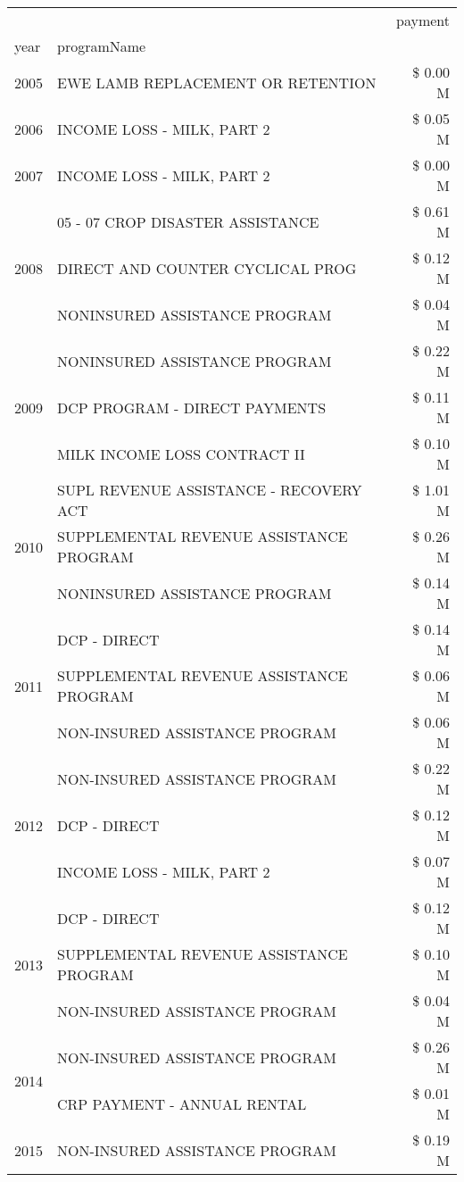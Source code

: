 \begin{tabular}{llr}
\toprule
 &  & payment \\
year & programName &  \\
\midrule
2005 & EWE LAMB REPLACEMENT OR RETENTION & \$ 0.00 M \\
\cline{1-3}
2006 & INCOME LOSS - MILK, PART 2 & \$ 0.05 M \\
\cline{1-3}
2007 & INCOME LOSS - MILK, PART 2 & \$ 0.00 M \\
\cline{1-3}
\multirow[t]{3}{*}{2008} & 05 - 07 CROP DISASTER ASSISTANCE & \$ 0.61 M \\
 & DIRECT AND COUNTER CYCLICAL PROG & \$ 0.12 M \\
 & NONINSURED ASSISTANCE PROGRAM & \$ 0.04 M \\
\cline{1-3}
\multirow[t]{3}{*}{2009} & NONINSURED ASSISTANCE PROGRAM & \$ 0.22 M \\
 & DCP PROGRAM - DIRECT PAYMENTS & \$ 0.11 M \\
 & MILK INCOME LOSS CONTRACT II & \$ 0.10 M \\
\cline{1-3}
\multirow[t]{3}{*}{2010} & SUPL REVENUE ASSISTANCE - RECOVERY ACT & \$ 1.01 M \\
 & SUPPLEMENTAL REVENUE ASSISTANCE PROGRAM & \$ 0.26 M \\
 & NONINSURED ASSISTANCE PROGRAM & \$ 0.14 M \\
\cline{1-3}
\multirow[t]{3}{*}{2011} & DCP - DIRECT & \$ 0.14 M \\
 & SUPPLEMENTAL REVENUE ASSISTANCE PROGRAM & \$ 0.06 M \\
 & NON-INSURED ASSISTANCE PROGRAM & \$ 0.06 M \\
\cline{1-3}
\multirow[t]{3}{*}{2012} & NON-INSURED ASSISTANCE PROGRAM & \$ 0.22 M \\
 & DCP - DIRECT & \$ 0.12 M \\
 & INCOME LOSS - MILK, PART 2 & \$ 0.07 M \\
\cline{1-3}
\multirow[t]{3}{*}{2013} & DCP - DIRECT & \$ 0.12 M \\
 & SUPPLEMENTAL REVENUE ASSISTANCE PROGRAM & \$ 0.10 M \\
 & NON-INSURED ASSISTANCE PROGRAM & \$ 0.04 M \\
\cline{1-3}
\multirow[t]{2}{*}{2014} & NON-INSURED ASSISTANCE PROGRAM & \$ 0.26 M \\
 & CRP PAYMENT - ANNUAL RENTAL & \$ 0.01 M \\
\cline{1-3}
\multirow[t]{3}{*}{2015} & NON-INSURED ASSISTANCE PROGRAM & \$ 0.19 M \\

\end{tabular}
